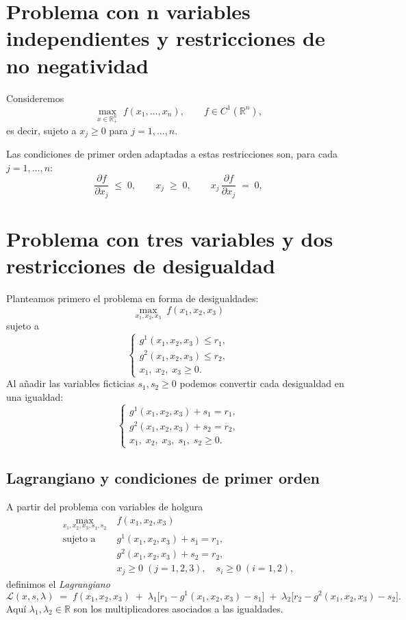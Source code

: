 \documentclass{article}
\begin{document}
\section*{Problema con n variables independientes y restricciones de no negatividad}



Consideremos
\[
\max_{x\in\mathbb R^n_+} \;f(x_1,\dots,x_n),\qquad f\in C^1(\mathbb R^n),
\]
es decir, sujeto a \(x_j\ge0\) para \(j=1,\dots,n\). 

Las condiciones de primer orden adaptadas a estas restricciones son, para cada \(j=1,\dots,n\):
\[
\frac{\partial f}{\partial x_j}
 \;\le\;0,\qquad
x_j\;\ge\;0,\qquad
x_j\,\frac{\partial f}{\partial x_j}
\;=\;0,
\]



\section*{Problema con tres variables y dos restricciones de desigualdad}

Planteamos primero el problema en forma de desigualdades:
\[
\max_{x_1,x_2,x_3}\;f(x_1,x_2,x_3)
\]
sujeto a
\[
\begin{cases}
g^1(x_1,x_2,x_3)\le r_1,\\
g^2(x_1,x_2,x_3)\le r_2,\\
x_1,\;x_2,\;x_3\ge0.
\end{cases}
\]
Al añadir las variables ficticias \(s_1,s_2\ge0\) podemos convertir cada desigualdad en una igualdad:
\[
\begin{cases}
g^1(x_1,x_2,x_3) + s_1 = r_1,\\
g^2(x_1,x_2,x_3) + s_2 = r_2,\\
x_1,\;x_2,\;x_3,\;s_1,\;s_2\ge0.
\end{cases}
\]


\subsection*{Lagrangiano y condiciones de primer orden}

A partir del problema con variables de holgura  
\[
\begin{aligned}
\max_{x_1,x_2,x_3,s_1,s_2}\;&f(x_1,x_2,x_3)\\
\text{sujeto a}\quad 
&g^1(x_1,x_2,x_3)+s_1 = r_1,\\
&g^2(x_1,x_2,x_3)+s_2 = r_2,\\
&x_j\ge0\;(j=1,2,3),\quad s_i\ge0\;(i=1,2),
\end{aligned}
\]
definimos el \emph{Lagrangiano}
\[
\mathcal{L}(x,s,\lambda)
\;=\;
f(x_1,x_2,x_3)
\;+\;\lambda_1\bigl[r_1 - g^1(x_1,x_2,x_3) - s_1\bigr]
\;+\;\lambda_2\bigl[r_2 - g^2(x_1,x_2,x_3) - s_2\bigr].
\]
Aquí \(\lambda_1,\lambda_2\in\mathbb R\) son los multiplicadores asociados a las igualdades.
\end{document}
